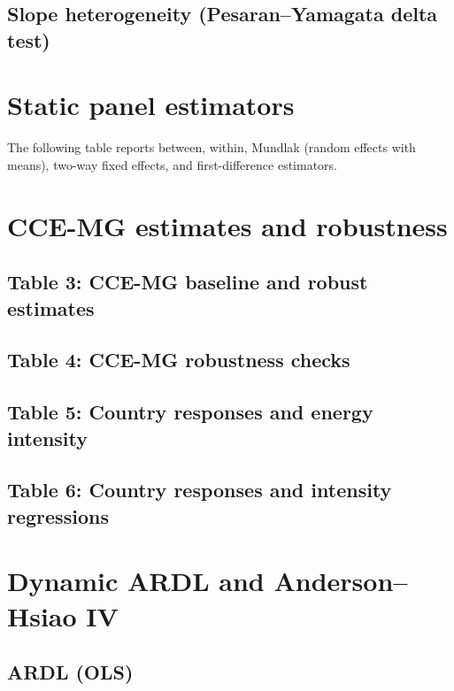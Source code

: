\documentclass[11pt]{article}
\begin{document}
\subsection*{Slope heterogeneity (Pesaran--Yamagata delta test)}

\section*{Static panel estimators}
The following table reports between, within, Mundlak (random effects with means), two-way fixed effects, and first-difference estimators.


\section*{CCE-MG estimates and robustness}
\subsection*{Table 3: CCE-MG baseline and robust estimates}

\subsection*{Table 4: CCE-MG robustness checks}

\subsection*{Table 5: Country responses and energy intensity}

\subsection*{Table 6: Country responses and intensity regressions}

\section*{Dynamic ARDL and Anderson--Hsiao IV}
\subsection*{ARDL (OLS)}
\end{document}
